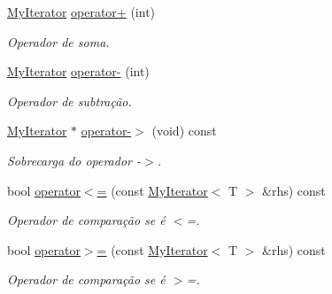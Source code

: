 \begin{DoxyCompactItemize}
\mbox{\label{classsc_1_1MyIterator_a493264c7561ef545b06d47c0b5835d59}} 
\hyperlink{classsc_1_1MyIterator}{My\+Iterator} \hyperlink{classsc_1_1MyIterator_a493264c7561ef545b06d47c0b5835d59}{operator+} (int)
\begin{DoxyCompactList}\small\item\em Operador de soma. \end{DoxyCompactList}\item 
\mbox{\label{classsc_1_1MyIterator_a8e2ffa4f2a06d9377238bccb8954b2c0}} 
\hyperlink{classsc_1_1MyIterator}{My\+Iterator} \hyperlink{classsc_1_1MyIterator_a8e2ffa4f2a06d9377238bccb8954b2c0}{operator-\/} (int)
\begin{DoxyCompactList}\small\item\em Operador de subtração. \end{DoxyCompactList}\item 
\mbox{\label{classsc_1_1MyIterator_a5d82243284e5b50a286e9b45b4566623}} 
\hyperlink{classsc_1_1MyIterator}{My\+Iterator} $\ast$ \hyperlink{classsc_1_1MyIterator_a5d82243284e5b50a286e9b45b4566623}{operator-\/$>$} (void) const
\begin{DoxyCompactList}\small\item\em Sobrecarga do operador -\/$>$. \end{DoxyCompactList}\item 
\mbox{\label{classsc_1_1MyIterator_ad8c2b40a518b2f112784f8fb2fe3e8fe}} 
bool \hyperlink{classsc_1_1MyIterator_ad8c2b40a518b2f112784f8fb2fe3e8fe}{operator$<$=} (const \hyperlink{classsc_1_1MyIterator}{My\+Iterator}$<$ T $>$ \&rhs) const
\begin{DoxyCompactList}\small\item\em Operador de comparação se é $<$=. \end{DoxyCompactList}\item 
\mbox{\label{classsc_1_1MyIterator_ae8dbcb46b7277bc105903ae149670600}} 
bool \hyperlink{classsc_1_1MyIterator_ae8dbcb46b7277bc105903ae149670600}{operator$>$=} (const \hyperlink{classsc_1_1MyIterator}{My\+Iterator}$<$ T $>$ \&rhs) const
\begin{DoxyCompactList}\small\item\em Operador de comparação se é $>$=. \end{DoxyCompactList}\item 

\end{DoxyCompactItemize}
